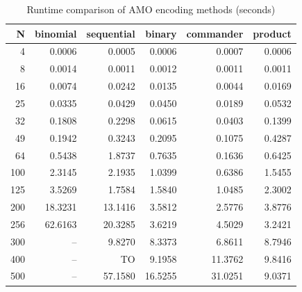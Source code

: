 \begin{table}[htbp]
\centering
\caption{Runtime comparison of AMO encoding methods (seconds)}
\label{tab:exp1_runtime}
\begin{tabular}{rrrrrr}
\hline
N & binomial & sequential & binary & commander & product \\
\hline
4 & 0.0006 & 0.0005 & 0.0006 & 0.0007 & 0.0006 \\
8 & 0.0014 & 0.0011 & 0.0012 & 0.0011 & 0.0011 \\
16 & 0.0074 & 0.0242 & 0.0135 & 0.0044 & 0.0169 \\
25 & 0.0335 & 0.0429 & 0.0450 & 0.0189 & 0.0532 \\
32 & 0.1808 & 0.2298 & 0.0615 & 0.0403 & 0.1399 \\
49 & 0.1942 & 0.3243 & 0.2095 & 0.1075 & 0.4287 \\
64 & 0.5438 & 1.8737 & 0.7635 & 0.1636 & 0.6425 \\
100 & 2.3145 & 2.1935 & 1.0399 & 0.6386 & 1.5455 \\
125 & 3.5269 & 1.7584 & 1.5840 & 1.0485 & 2.3002 \\
200 & 18.3231 & 13.1416 & 3.5812 & 2.5776 & 3.8776 \\
256 & 62.6163 & 20.3285 & 3.6219 & 4.5029 & 3.2421 \\
300 & -- & 9.8270 & 8.3373 & 6.8611 & 8.7946 \\
400 & -- & TO & 9.1958 & 11.3762 & 9.8416 \\
500 & -- & 57.1580 & 16.5255 & 31.0251 & 9.0371 \\
\hline
\end{tabular}
\end{table}